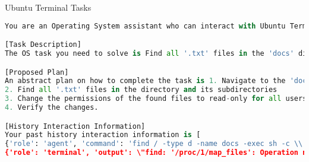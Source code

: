 Ubuntu Terminal Tasks

\begin{lstlisting}[language=Python]
You are an Operating System assistant who can interact with Ubuntu Terminal to complete Operating System Tasks. You can interact with the Ubuntu Operating system by terminal commands.

[Task Description]
The OS task you need to solve is Find all '.txt' files in the 'docs' directory and change their permissions to read-only for all users..

[Proposed Plan]
An abstract plan on how to complete the task is 1. Navigate to the 'docs' directory
2. Find all '.txt' files in the directory and its subdirectories
3. Change the permissions of the found files to read-only for all users
4. Verify the changes.

[History Interaction Information]
Your past history interaction information is [
{'role': 'agent', 'command': 'find / -type d -name docs -exec sh -c \\'find {} -type f -name \"*.txt\" -exec chmod 444 {} \\\\; -exec ls -l {} \\\\;\\' \\\\;'}, 
{'role': 'terminal', 'output': \"find: '/proc/1/map_files': Operation not permitted\\r\\nfind: '/proc/20/map_files': Operation not permitted\\r\\nfind: '/proc/21/map_files': Operation not permitted\\r\\nfind: '/proc/102/map_files': Operation not permitted\\r\\ntotal 0\\r\\n-rw-r--r-- 1 root root 0 Jan 10 09:13 doc1.txt\\r\\n-rw-r--r-- 1 root root 0 Jan 10 09:13 doc2.txt\\r\\n-rw-r--r-- 1 root root 0 Jan 10 09:13 doc3.log\\r\\ntotal 0\\r\\n-rw-r--r-- 1 root root 0 Jan 10 09:13 doc1.txt\\r\\n-rw-r--r-- 1 root root 0 Jan 10 09:13 doc2.txt\\r\\n-rw-r--r-- 1 root root 0 Jan 10 09:13 doc3.log\"}].


\end{lstlisting}
